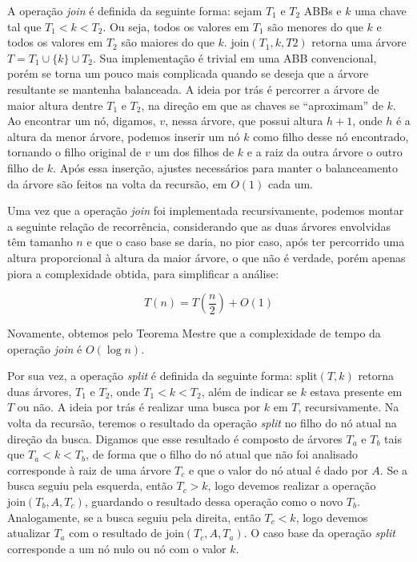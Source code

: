 \documentclass[a4paper,12pt]{report}
\begin{document}
A operação \textit{join} é definida da seguinte forma: sejam $T_1$ e $T_2$ ABBs e $k$ uma 
chave tal que $T_1 < k < T_2$. Ou seja, todos os valores em $T_1$ são menores do que $k$ 
e todos os valores em $T_2$ são maiores do que $k$. $\textrm{join}(T_1, k, T2)$ retorna uma 
árvore $T = T_1 \cup \{k\} \cup T_2$. Sua implementação é trivial em uma ABB convencional, 
porém se torna um pouco mais complicada quando se deseja que a árvore resultante se mantenha 
balanceada. A ideia por trás é percorrer a árvore de maior altura dentre $T_1$ e $T_2$, na 
direção em que as chaves se ``aproximam'' de $k$. Ao encontrar um nó, digamos, $v$, nessa árvore,
que possui altura $h + 1$, onde $h$ é a altura da menor árvore, podemos inserir um nó $k$ 
como filho desse nó encontrado, tornando o filho original de $v$ um dos filhos de $k$ e a 
raiz da outra árvore o outro filho de $k$. Após essa inserção, ajustes necessários para 
manter o balanceamento da árvore são feitos na volta da recursão, em $O(1)$ cada um.

Uma vez que a operação \textit{join} foi implementada recursivamente, podemos montar a seguinte 
relação de recorrência, considerando que as duas árvores envolvidas têm tamanho $n$ e que o
caso base se daria, no pior caso, após ter percorrido uma altura proporcional à altura da 
maior árvore, o que não é verdade, porém apenas piora a complexidade obtida, para simplificar 
a análise:

\[
                               T(n) = T\left(\frac{n}{2}\right) + O(1)
\]

Novamente, obtemos pelo Teorema Mestre que a complexidade de tempo da operação \textit{join} é 
$O(\log n)$.

Por sua vez, a operação \textit{split} é definida da seguinte forma: $\textrm{split}(T, k)$ 
retorna duas árvores, $T_1$ e $T_2$, onde $T_1 < k < T_2$, além de indicar se $k$ estava presente 
em $T$ ou não. A ideia por trás é realizar uma busca por $k$ em $T$, recursivamente. Na volta da 
recursão, teremos o resultado da operação \textit{split} no filho do nó atual na direção da busca. 
Digamos que esse resultado é composto de árvores $T_a$ e $T_b$ tais que $T_a < k < T_b$, de forma 
que o filho do nó atual que não foi analisado corresponde à raiz de uma árvore $T_c$ e que o valor 
do nó atual é dado por $A$. Se a busca seguiu pela esquerda, então $T_c > k$, logo devemos realizar 
a operação $\textrm{join}(T_b, A, T_c)$, guardando o resultado dessa operação como o novo $T_b$. 
Analogamente, se a busca seguiu pela direita, então $T_c < k$, logo devemos atualizar $T_a$ com o 
resultado de $\textrm{join}(T_c, A, T_a)$. O caso base da operação \textit{split} corresponde a um 
nó nulo ou nó com o valor $k$.
\end{document}
